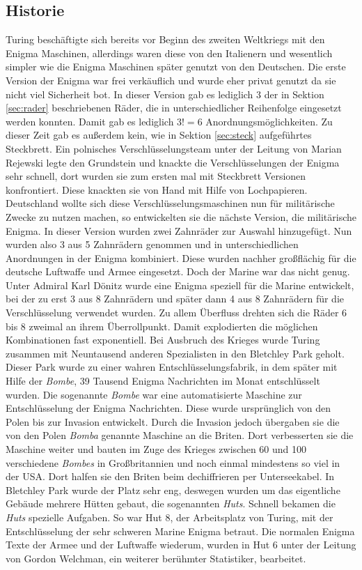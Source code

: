 \subsection{Historie}
Turing beschäftigte sich bereits vor Beginn des zweiten Weltkriegs mit den Enigma Maschinen, allerdings waren diese von den Italienern und wesentlich simpler wie die Enigma Maschinen später genutzt von den Deutschen. Die erste Version der Enigma war frei verkäuflich und wurde eher privat genutzt da sie nicht viel Sicherheit bot. In dieser Version gab es lediglich 3 der in Sektion \ref{sec:rader} beschriebenen Räder, die in unterschiedlicher Reihenfolge eingesetzt werden konnten. Damit gab es lediglich $3! = 6$ Anordnungsmöglichkeiten. Zu dieser Zeit gab es außerdem kein, wie in Sektion \ref{sec:steck} aufgeführtes Steckbrett. Ein polnisches Verschlüsselungsteam unter der Leitung von Marian Rejewski legte den Grundstein und knackte die Verschlüsselungen der Enigma sehr schnell, dort wurden sie zum ersten mal mit Steckbrett Versionen konfrontiert. Diese knackten sie von Hand mit Hilfe von Lochpapieren. Deutschland wollte sich diese Verschlüsselungsmaschinen nun für militärische Zwecke zu nutzen machen, so entwickelten sie die nächste Version, die militärische Enigma. In dieser Version wurden zwei Zahnräder zur Auswahl hinzugefügt. Nun wurden also 3 aus 5 Zahnrädern genommen und in unterschiedlichen Anordnungen in der Enigma kombiniert. Diese wurden nachher großflächig für die deutsche Luftwaffe und Armee eingesetzt. Doch der Marine war das nicht genug. Unter Admiral Karl Dönitz wurde eine Enigma speziell für die Marine entwickelt, bei der zu erst 3 aus 8 Zahnrädern und später dann 4 aus 8 Zahnrädern für die Verschlüsselung verwendet wurden. Zu allem Überfluss drehten sich die Räder 6 bis 8 zweimal an ihrem Überrollpunkt. Damit explodierten die möglichen Kombinationen fast exponentiell. Bei Ausbruch des Krieges wurde Turing zusammen mit Neuntausend anderen Spezialisten in den Bletchley Park geholt. Dieser Park wurde zu einer wahren Entschlüsselungsfabrik, in dem später mit Hilfe der \emph{Bombe}, 39 Tausend Enigma Nachrichten im Monat entschlüsselt wurden. Die sogenannte \emph{Bombe} war eine automatisierte Maschine zur Entschlüsselung der Enigma Nachrichten. Diese wurde ursprünglich von den Polen bis zur Invasion entwickelt. Durch die Invasion jedoch übergaben sie die von den Polen \emph{Bomba} genannte Maschine an die Briten. Dort verbesserten sie die Maschine weiter und bauten im Zuge des Krieges zwischen 60 und 100 verschiedene \emph{Bombes} in Großbritannien und noch einmal mindestens so viel in der USA. Dort halfen sie den Briten beim dechiffrieren per Unterseekabel. In Bletchley Park wurde der Platz sehr eng, deswegen wurden um das eigentliche Gebäude mehrere Hütten gebaut, die sogenannten \emph{Huts}. Schnell bekamen die \emph{Huts} spezielle Aufgaben. So war Hut 8, der Arbeitsplatz von Turing, mit der Entschlüsselung der sehr schweren Marine Enigma betraut. Die normalen Enigma Texte der Armee und der Luftwaffe wiederum, wurden in Hut 6 unter der Leitung von Gordon Welchman, ein weiterer berühmter Statistiker, bearbeitet.  \cite{enigmaproblem1} \cite{theessentialturing}

